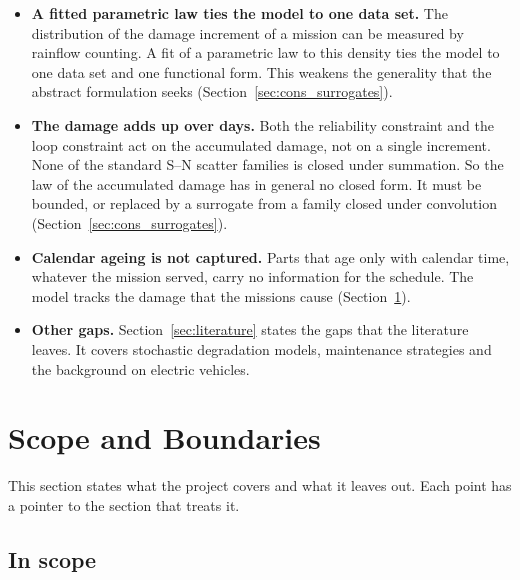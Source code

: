 \documentclass[11pt,a4paper]{article}
\theoremstyle{plain}
\theoremstyle{definition}
\theoremstyle{remark}
\begin{document}
\begin{itemize}
  \item \textbf{A fitted parametric law ties the model to one data set.}
    The distribution of the damage increment of a mission can be measured by rainflow counting.
    A fit of a parametric law to this density ties the model to one data set and one functional form.
    This weakens the generality that the abstract formulation seeks (Section~\ref{sec:cons_surrogates}).
  \item \textbf{The damage adds up over days.}
    Both the reliability constraint and the loop constraint act on the accumulated damage, not on a single increment.
    None of the standard S--N scatter families is closed under summation.
    So the law of the accumulated damage has in general no closed form.
    It must be bounded, or replaced by a surrogate from a family closed under convolution (Section~\ref{sec:cons_surrogates}).
  \item \textbf{Calendar ageing is not captured.}
    Parts that age only with calendar time, whatever the mission served, carry no information for the schedule.
    The model tracks the damage that the missions cause (Section~\ref{sec:scope}).
  \item \textbf{Other gaps.}
    Section~\ref{sec:literature} states the gaps that the literature leaves.
    It covers stochastic degradation models, maintenance strategies and the background on electric vehicles.
\end{itemize}

\section{Scope and Boundaries}
\label{sec:scope}

This section states what the project covers and what it leaves out.
Each point has a pointer to the section that treats it.

\subsection{In scope}
\end{document}
